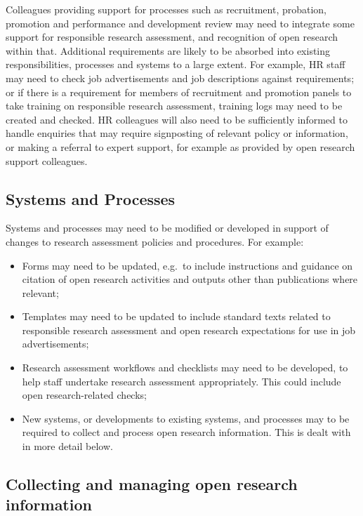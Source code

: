 \documentclass[
  letterpaper,
  DIV=11,
  numbers=noendperiod,
  oneside]{scrreprt}
\begin{document}
Colleagues providing support for processes such as recruitment,
probation, promotion and performance and development review may need to
integrate some support for responsible research assessment, and
recognition of open research within that. Additional requirements are
likely to be absorbed into existing responsibilities, processes and
systems to a large extent. For example, HR staff may need to check job
advertisements and job descriptions against requirements; or if there is
a requirement for members of recruitment and promotion panels to take
training on responsible research assessment, training logs may need to
be created and checked. HR colleagues will also need to be sufficiently
informed to handle enquiries that may require signposting of relevant
policy or information, or making a referral to expert support, for
example as provided by open research support colleagues.

\subsection{Systems and Processes}\label{systems-and-processes}

Systems and processes may need to be modified or developed in support of
changes to research assessment policies and procedures. For example:

\begin{itemize}
\item
  Forms may need to be updated, e.g.~to include instructions and
  guidance on citation of open research activities and outputs other
  than publications where relevant;
\item
  Templates may need to be updated to include standard texts related to
  responsible research assessment and open research expectations for use
  in job advertisements;
\item
  Research assessment workflows and checklists may need to be developed,
  to help staff undertake research assessment appropriately. This could
  include open research-related checks;
\item
  New systems, or developments to existing systems, and processes may to
  be required to collect and process open research information. This is
  dealt with in more detail below.
\end{itemize}

\subsection{Collecting and managing open research
information}\label{collecting-and-managing-open-research-information}
\end{document}
